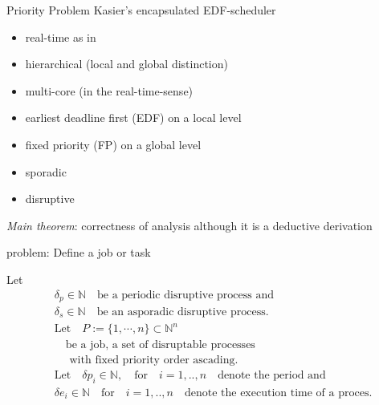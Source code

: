 \documentclass{beamer}
\begin{document}
	
 	\begin{frame}{Priority Problem}
		Kasier's  encapsulated EDF-scheduler \cite{K}
		\begin{itemize}
			\item real-time as in \cite{KBK}
			\item hierarchical (local and global distinction)
			\item multi-core (in the real-time-sense)
			\item earliest deadline first (EDF) on a local level
			\item fixed priority (FP) on a global level
			\item sporadic 
			\item disruptive
		\end{itemize}	
		\emph{Main theorem}: correctness of analysis although it is a deductive derivation				
 	\end{frame}
 	
 	


 	
 	\begin{frame}{problem: Define a job or  task}
 		\begin{definition}
		Let      
			\begin{align*} & \delta_p \in \mathbb{N} \quad \text{be a periodic disruptive process and}\\
 	&\delta_s \in  \mathbb{N} \quad \text{be an asporadic disruptive process.}\\
	 &\text{Let} \quad P := \{1, \cdots, n \} \subset \mathbb{N}^n \\
	 &\quad \text{be a job, a set of disruptable processes}\\
	 &\quad \text{ with fixed priority order ascading.} \\
 	&\text{Let} \quad  \delta p_i \in \mathbb{N}, \quad \text{for} \quad i = 1,..,n \quad  \text{denote the period and}  \\
 	&\delta e_i \in \mathbb{N} \quad \text{for} \quad  i = 1,..,n \quad  \text{denote the execution time of a proces}.  
			\end{align*}   
		\end{definition}
 	\end{frame}
 	
\end{document}
